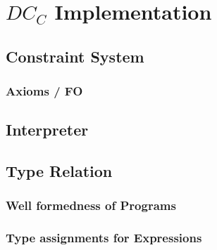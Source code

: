 \chapter{$DC_C$ Implementation}
\section{Constraint System}
\subsection{Axioms / FO}
\section{Interpreter}
\section{Type Relation}
\subsection{Well formedness of Programs}
\subsection{Type assignments for Expressions}

